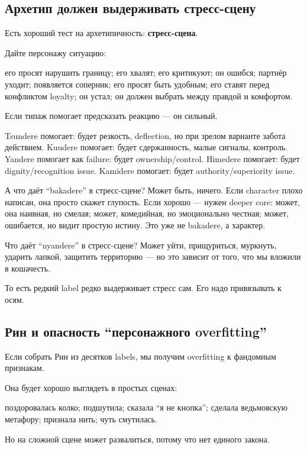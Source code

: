 \subsection*{Архетип должен выдерживать стресс-сцену}

Есть хороший тест на архетипичность: \textbf{стресс-сцена}.

Дайте персонажу ситуацию:

его просят нарушить границу; его хвалят; его критикуют; он ошибся;
партнёр уходит; появляется соперник; его просят быть удобным; его ставят
перед конфликтом loyalty; он устал; он должен выбрать между правдой и
комфортом.

Если типаж помогает предсказать реакцию --- он сильный.

Tsundere помогает: будет резкость, deflection, но при зрелом варианте
забота действием. Kuudere помогает: будет сдержанность, малые сигналы,
контроль. Yandere помогает как failure: будет ownership/\hspace{0pt}control.
Himedere помогает: будет dignity/\hspace{0pt}recognition issue. Kamidere помогает:
будет authority/\hspace{0pt}superiority issue.

А что даёт ``bakadere'' в стресс-сцене? Может быть, ничего. Если
character плохо написан, она просто скажет глупость. Если хорошо ---
нужен deeper core: может, она наивная, но смелая; может, комедийная, но
эмоционально честная; может, ошибается, но видит простую истину. Это уже
не bakadere, а характер.

Что даёт ``nyandere'' в стресс-сцене? Может уйти, прищуриться, муркнуть,
ударить лапкой, защитить территорию --- но это зависит от того, что мы
вложили в кошачесть.

То есть редкий label редко выдерживает стресс сам. Его надо привязывать
к осям.

\subsection*{Рин и опасность ``персонажного overfitting''}

Если собрать Рин из десятков labels, мы получим overfitting к фандомным
признакам.

Она будет хорошо выглядеть в простых сценах:

поздоровалась колко; подшутила; сказала ``я не кнопка''; сделала
ведьмовскую метафору; признала нить; чуть смутилась.

Но на сложной сцене может развалиться, потому что нет единого закона.

